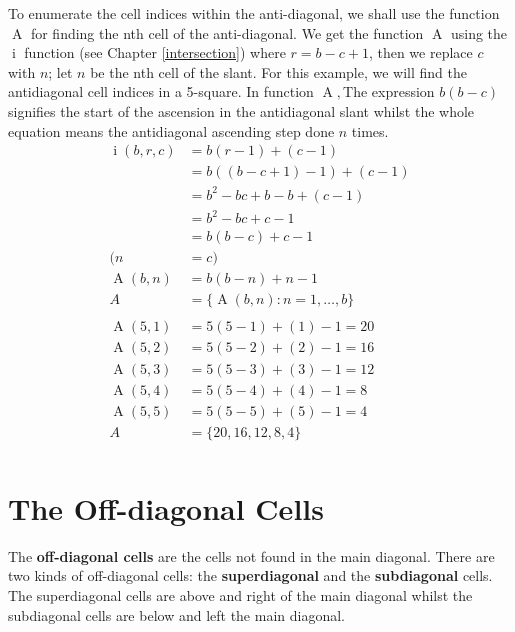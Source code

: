 \documentclass[twoside,openany,12pt]{book}
\begin{document}
    To enumerate the cell indices within the anti-diagonal, we shall use the function $\operatorname{A}$ for finding the nth cell of the anti-diagonal. We get the function $\operatorname{A}$ using the $\operatorname{i}$ function (see Chapter \ref{intersection}) where $r = b - c + 1$, then we replace $c$ with $n$; let $n$ be the nth cell of the slant. For this example, we will find the antidiagonal cell indices in a 5-square. In function $\operatorname{A}, $The expression $b(b - c)$ signifies the start of the ascension in the antidiagonal slant whilst the whole equation means the antidiagonal ascending step done $n$ times.
    \begin{equation}
        \begin{split}
            \operatorname{i}(b,r,c) &= b(r-1)+(c-1) \\
                &= b((b - c + 1) - 1) + (c-1) \\
                &= b^2 - bc + b - b + (c-1) \\
                &= b^2 - bc + c - 1 \\
                &= b(b - c) + c - 1 \\
               (n &= c) \\
            \operatorname{A}(b,n) &= b(b - n) + n - 1 \\
            A &= \{ \operatorname{A}(b,n) : n = 1, \dots, b \} \\
            \\
            \operatorname{A}(5,1) &= 5(5 - 1) + (1) - 1 = 20\\
            \operatorname{A}(5,2) &= 5(5 - 2) + (2) - 1 = 16\\
            \operatorname{A}(5,3) &= 5(5 - 3) + (3) - 1 = 12\\
            \operatorname{A}(5,4) &= 5(5 - 4) + (4) - 1 = 8\\
            \operatorname{A}(5,5) &= 5(5 - 5) + (5) - 1 = 4\\
            A &= \{ 20, 16, 12, 8, 4 \} \\
        \end{split}
    \end{equation}


    \section{The Off-diagonal Cells} \label{offdiagonal_cells}
    The \textbf{off-diagonal cells} are the cells not found in the main diagonal. There are two kinds of off-diagonal cells: the \textbf{superdiagonal} and the \textbf{subdiagonal} cells. The superdiagonal cells are above and right of the main diagonal whilst the subdiagonal cells are below and left the main diagonal.
\end{document}
